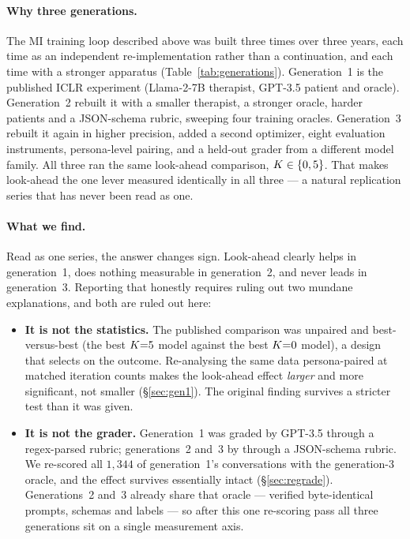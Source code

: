 \paragraph{Why three generations.}
The MI training loop described above was built three times over three years, each time as an
independent re-implementation rather than a continuation, and each time with a stronger
apparatus (Table~\ref{tab:generations}). Generation~1 is the published ICLR experiment
(Llama-2-7B therapist, GPT-3.5 patient and oracle). Generation~2 rebuilt it with a smaller
therapist, a stronger oracle, harder patients and a JSON-schema rubric, sweeping four
training oracles. Generation~3 rebuilt it again in higher precision, added a second
optimizer, eight evaluation instruments, persona-level pairing, and a held-out grader from
a different model family. All three ran the same look-ahead comparison, $K \in \{0,5\}$.
That makes look-ahead the one lever measured identically in all three --- a natural
replication series that has never been read as one.

\paragraph{What we find.}
Read as one series, the answer changes sign. Look-ahead clearly helps in generation~1, does
nothing measurable in generation~2, and never leads in generation~3. Reporting that
honestly requires ruling out two mundane explanations, and both are ruled out here:

\begin{itemize}\itemsep2pt
  \item \textbf{It is not the statistics.} The published comparison was unpaired and
  best-versus-best (the best $K{=}5$ model against the best $K{=}0$ model), a design that
  selects on the outcome. Re-analysing the same data persona-paired at matched iteration
  counts makes the look-ahead effect \emph{larger} and more significant, not smaller
  (\S\ref{sec:gen1}). The original finding survives a stricter test than it was given.

  \item \textbf{It is not the grader.} Generation~1 was graded by GPT-3.5 through a
  regex-parsed rubric; generations~2 and~3 by \primaryjudge{} through a JSON-schema rubric.
  We re-scored all $1{,}344$ of generation~1's conversations with the generation-3 oracle,
  and the effect survives essentially intact (\S\ref{sec:regrade}). Generations~2 and~3
  already share that oracle --- verified byte-identical prompts, schemas and labels --- so
  after this one re-scoring pass all three generations sit on a single measurement axis.
\end{itemize}

